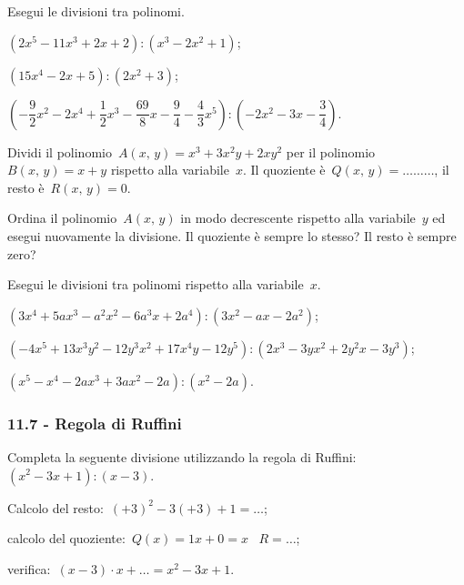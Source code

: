 \begin{esercizio}
\label{ese:11.28}
Esegui le divisioni tra polinomi.
 \begin{enumeratea}
 \item $\left(2x^{5}-11x^{3}+2x+2\right):\left(x^{3}-2x^{2}+1\right)$;
 \item $\left(15x^{4}-2x+5\right):\left(2x^{2}+3\right)$;
 \item $\left(-{\dfrac{9}{2}}x^{2}-2x^{4}+\dfrac{1}{2}x^{3}-\dfrac{69}{8}x-\dfrac{9}{4}-\dfrac{4}{3}x^{5}\right):\left(-2x^{2}-3x-\dfrac{3}{4}\right)$.
 \end{enumeratea}
\end{esercizio}


\begin{esercizio}
\label{ese:11.29}
Dividi il polinomio~$A(x\text{,~}y)=x^{3}+3x^{2}y+2xy^{2}$ per il polinomio~$B(x\text{,~}y)=x+y$ rispetto alla variabile~$x$.
Il quoziente è~$Q(x\text{,~}y)=\ldots \ldots \ldots$, il resto è~$R(x\text{,~}y)=0$.

Ordina il polinomio~$A(x\text{,~}y)$ in modo decrescente rispetto alla variabile~$y$ ed esegui
nuovamente la divisione. Il quoziente è sempre lo stesso? Il resto è sempre zero?
\end{esercizio}

\begin{esercizio}
\label{ese:11.30}
Esegui le divisioni tra polinomi rispetto alla variabile~$x$.
 \begin{enumeratea}
 \item $\left(3x^{4}+5ax^{3}-a^{2}x^{2}-6a^{3}x+2a^{4}\right):\left(3x^{2}-ax-2a^{2}\right)$;
 \item $\left(-4x^{5}+13x^{3}y^{2}-12y^{3}x^{2}+17x^{4}y-12y^{5}\right):\left(2x^{3}-3yx^{2}+2y^{2}x-3y^{3}\right)$;
 \item $\left(x^{5}-x^{4}-2ax^{3}+3ax^{2}-2a\right):\left(x^{2}-2a\right)$.
 \end{enumeratea}
\end{esercizio}

\subsubsection*{11.7 - Regola di Ruffini}

\begin{esercizio}
\label{ese:11.31}
Completa la seguente divisione utilizzando la regola di Ruffini:\:$\left(x^{2}-3x+1\right):(x-3)$.
\begin{itemize*}
\item Calcolo del resto:~$(+3)^{2}-3(+3)+1=\ldots$;
\item calcolo del quoziente:~$Q(x)=1x+0=x$ \quad~$R=\ldots$;
\item verifica:~$(x-3)\cdot x+\ldots =x^{2}-3x+1$.
\end{itemize*}
\end{esercizio}

